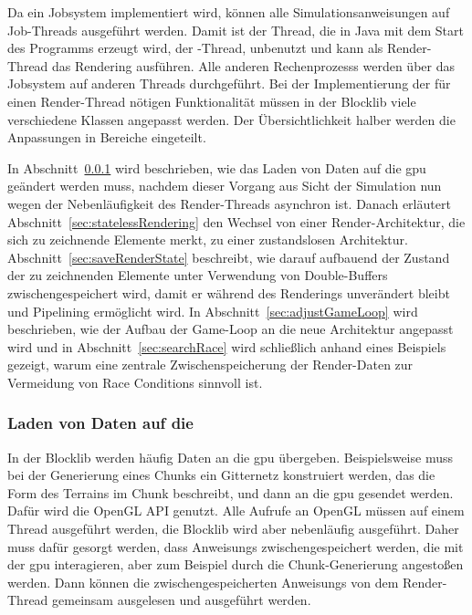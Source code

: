 Da ein Jobsystem implementiert wird, können alle Simulationsanweisungen auf Job-Threads ausgeführt werden. Damit ist der Thread, die in Java mit dem Start des Programms erzeugt wird, der -Thread, unbenutzt und kann als Render-Thread das Rendering ausführen. Alle anderen \glspl{Rechenprozess} werden über das Jobsystem auf anderen Threads durchgeführt. Bei der Implementierung der für einen Render-Thread nötigen Funktionalität müssen in der Blocklib viele verschiedene Klassen angepasst werden. Der Übersichtlichkeit halber werden die Anpassungen in Bereiche eingeteilt. 

In Abschnitt~\ref{sec:loader} wird beschrieben, wie das Laden von Daten auf die \ac{gpu} geändert werden muss, nachdem dieser Vorgang aus Sicht der Simulation nun wegen der Nebenläufigkeit des Render-Threads asynchron ist. Danach erläutert Abschnitt~\ref{sec:statelessRendering} den Wechsel von einer Render-Architektur, die sich zu zeichnende Elemente merkt, zu einer zustandslosen Architektur. Abschnitt~\ref{sec:saveRenderState} beschreibt, wie darauf aufbauend der Zustand der zu zeichnenden Elemente unter Verwendung von Double-Buffers zwischengespeichert wird, damit er während des Renderings unverändert bleibt und Pipelining ermöglicht wird. In Abschnitt~\ref{sec:adjustGameLoop} wird beschrieben, wie der Aufbau der Game-Loop an die neue Architektur angepasst wird und in Abschnitt~\ref{sec:searchRace} wird schließlich anhand eines Beispiels gezeigt, warum eine zentrale Zwischenspeicherung der Render-Daten zur Vermeidung von Race Conditions sinnvoll ist.

\subsubsection{Laden von Daten auf die }\label{sec:loader}
In der Blocklib werden häufig Daten an die \ac{gpu} übergeben. Beispielsweise muss bei der Generierung eines Chunks ein Gitternetz konstruiert werden, das die Form des Terrains im Chunk beschreibt, und dann an die \ac{gpu} gesendet werden. Dafür wird die OpenGL API genutzt. Alle Aufrufe an OpenGL müssen auf einem Thread ausgeführt werden, die Blocklib wird aber nebenläufig ausgeführt. Daher muss dafür gesorgt werden, dass \glspl{Anweisung} zwischengespeichert werden, die mit der \ac{gpu} interagieren, aber zum Beispiel durch die Chunk-Generierung angestoßen werden. Dann können die zwischengespeicherten \glspl{Anweisung} von dem Render-Thread gemeinsam ausgelesen und ausgeführt werden. 

